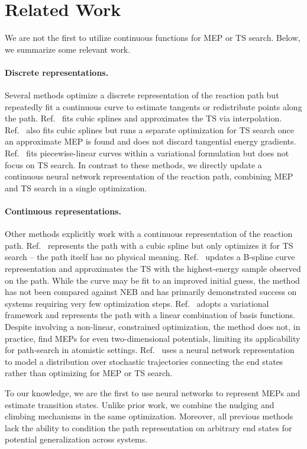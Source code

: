 \section{Related Work}
\label{sec:related}
We are not the first to utilize continuous functions for MEP or TS search. Below, we summarize some relevant work.

\paragraph{Discrete representations.}
Several methods\cite{string,gsm,improved_string,gmam} optimize a discrete representation of the reaction path but repeatedly fit a continuous curve to estimate tangents or redistribute points along the path. Ref.~ fits cubic splines and approximates the TS via interpolation. Ref.~ also fits cubic splines but runs a separate optimization for TS search once an approximate MEP is found and does not discard tangential energy gradients. Ref.~ fits piecewise-linear curves within a variational formulation but does not focus on TS search. In contrast to these methods, we directly update a continuous neural network representation of the reaction path, combining MEP and TS search in a single optimization.

\paragraph{Continuous representations.}
Other methods\cite{ssm,curve,vrpo,doob} explicitly work with a continuous representation of the reaction path. Ref.~ represents the path with a cubic spline but only optimizes it for TS search -- the path itself has no physical meaning. Ref.~ updates a B-spline curve representation and approximates the TS with the highest-energy sample observed on the path. While the curve may be fit to an improved initial guess\cite{idpp}, the method has not been compared against NEB and has primarily demonstrated success on systems requiring very few optimization steps. Ref.~ adopts a variational framework and represents the path with a linear combination of basis functions. Despite involving a non-linear, constrained optimization, the method does not, in practice, find MEPs for even two-dimensional potentials\cite{vrpo}, limiting its applicability for path-search in atomistic settings. 
Ref.~ uses a neural network representation to model a distribution over stochastic trajectories connecting the end states rather than optimizing for MEP or TS search. 

To our knowledge, we are the first to use neural networks to represent MEPs and estimate transition states. Unlike prior work, we combine the nudging and climbing mechanisms in the same optimization. Moreover, all previous methods lack the ability to condition the path representation on arbitrary end states for potential generalization across systems.